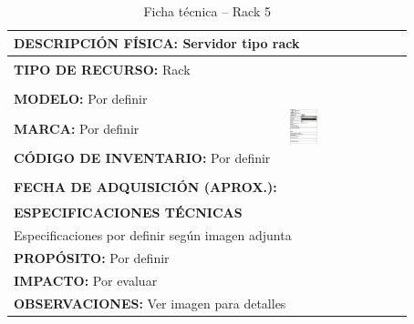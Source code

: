 \begin{table}[H]
\centering
\caption{Ficha técnica -- Rack 5}
\label{tab:rack-5}
\begin{tabular}{|p{}|p{}|}
\hline
\multicolumn{2}{|l|}{\textbf{DESCRIPCIÓN FÍSICA:} Servidor tipo rack} \\ \hline
\textbf{TIPO DE RECURSO:} Rack & 
\multirow{5}{*}{\includegraphics[width=0.25\textwidth,height=4cm,keepaspectratio]{tablas-images/cp1/racks/rack-5.png}} \\ \cline{1-1}
\textbf{MODELO:} Por definir & \\ \cline{1-1}
\textbf{MARCA:} Por definir & \\ \cline{1-1}
\textbf{CÓDIGO DE INVENTARIO:} Por definir & \\ \cline{1-1}
\textbf{FECHA DE ADQUISICIÓN (APROX.):} & \\ \hline
\multicolumn{2}{|l|}{\textbf{ESPECIFICACIONES TÉCNICAS}} \\ \hline
\multicolumn{2}{|p{0.95\textwidth}|}{
\footnotesize
Especificaciones por definir según imagen adjunta
} \\ \hline
\multicolumn{2}{|l|}{\textbf{PROPÓSITO:} Por definir} \\ \hline
\multicolumn{2}{|l|}{\textbf{IMPACTO:} Por evaluar} \\ \hline
\multicolumn{2}{|l|}{\textbf{OBSERVACIONES:} Ver imagen para detalles} \\ \hline
\end{tabular}
\end{table}

